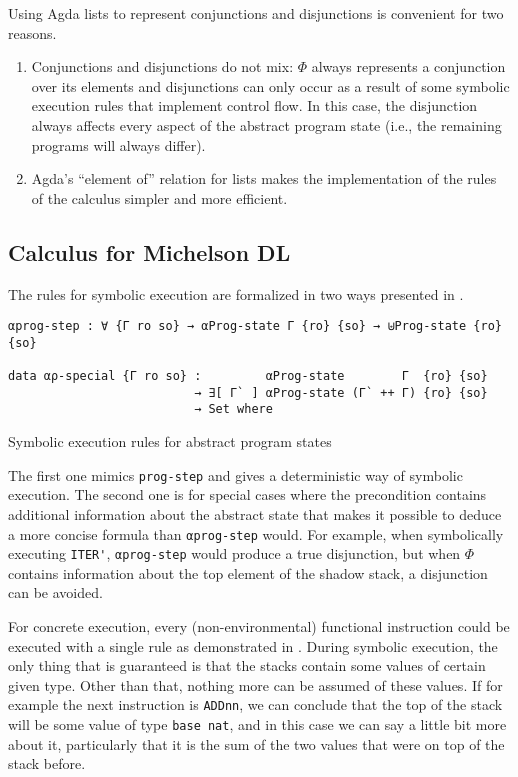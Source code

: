 Using Agda lists to represent conjunctions and disjunctions is
convenient for two reasons.
\begin{enumerate}
\item Conjunctions and disjunctions do not mix: $\Phi$ always represents a conjunction over its elements
  and disjunctions can only occur as a result of some
  symbolic execution rules that implement control flow. 
  In this case, the disjunction always affects every aspect of the abstract program state
  (i.e., the remaining programs will always differ).
\item Agda's ``element of'' relation for lists makes the
  implementation of the rules of the calculus simpler and more efficient.
\end{enumerate}

\subsection{Calculus for Michelson DL}\label{sec:calculus}

The rules for symbolic execution are formalized in two ways presented in .
\begin{listing}[!ht]
\begin{verbatim}
αprog-step : ∀ {Γ ro so} → αProg-state Γ {ro} {so} → ⊎Prog-state {ro} {so}

data αρ-special {Γ ro so} :         αProg-state        Γ  {ro} {so}
                          → ∃[ Γ` ] αProg-state (Γ` ++ Γ) {ro} {so}
                          → Set where
\end{verbatim}
\caption{Symbolic execution rules for abstract program states}
\label{aprog-all}
\end{listing}

The first one mimics \verb/prog-step/ and gives a deterministic way of symbolic execution.
The second one is for special cases where the precondition contains additional information
about the abstract state
that makes it possible to deduce a more concise formula than \verb/αprog-step/ would.
For example, when symbolically executing \verb/ITER'/, \verb/αprog-step/ would produce
a true disjunction, but when $\Phi$ contains information about the top element of the
shadow stack, a disjunction can be avoided.

For concrete execution, every (non-environmental) functional instruction could be executed
with a single rule as demonstrated in .
During symbolic execution, the only thing that is guaranteed is
that the stacks contain some values of certain given type.
Other than that, nothing more can be assumed of these values.
If for example the next instruction is \verb/ADDnn/, we can conclude that the top of the stack
will be some value of type \verb/base nat/, and in this case we can say a little bit more about
it, particularly that it is the sum of the two values that were on top of the stack before.

